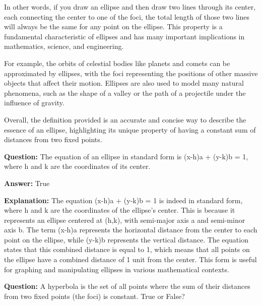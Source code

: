 \documentclass{article}
\begin{document}
In other words, if you draw an ellipse and then draw two lines through its center, each connecting the center to one of the foci, the total length of those two lines will always be the same for any point on the ellipse. This property is a fundamental characteristic of ellipses and has many important implications in mathematics, science, and engineering.

For example, the orbits of celestial bodies like planets and comets can be approximated by ellipses, with the foci representing the positions of other massive objects that affect their motion. Ellipses are also used to model many natural phenomena, such as the shape of a valley or the path of a projectile under the influence of gravity.

Overall, the definition provided is an accurate and concise way to describe the essence of an ellipse, highlighting its unique property of having a constant sum of distances from two fixed points.
                
                \vspace{0.5cm} 
        
            
                \textbf {Question:} The equation of an ellipse in standard form is (x-h){\texttwosuperior}a{\texttwosuperior} + (y-k){\texttwosuperior}b{\texttwosuperior} = 1, where h and k are the coordinates of its center.
                
                \textbf{Answer:} True

                \textbf{Explanation:} The equation (x-h){\texttwosuperior}a{\texttwosuperior} + (y-k){\texttwosuperior}b{\texttwosuperior} = 1 is indeed in standard form, where h and k are the coordinates of the ellipse's center. This is because it represents an ellipse centered at (h,k), with semi-major axis a and semi-minor axis b. The term (x-h){\texttwosuperior}a{\texttwosuperior} represents the horizontal distance from the center to each point on the ellipse, while (y-k){\texttwosuperior}b{\texttwosuperior} represents the vertical distance. The equation states that this combined distance is equal to 1, which means that all points on the ellipse have a combined distance of 1 unit from the center. This form is useful for graphing and manipulating ellipses in various mathematical contexts.
                
                \vspace{0.5cm} 
        
            
                \textbf {Question:} A hyperbola is the set of all points where the sum of their distances from two fixed points (the foci) is constant. True or False?
                
\end{document}

